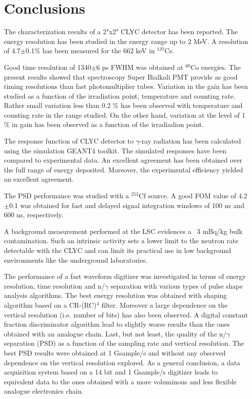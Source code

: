 \documentclass[review,number,sort&compress]{elsarticle}
\begin{document}
\section{Conclusions}
The characterization results of a 2"x2" CLYC detector has been reported. The energy resolution has been studied in the energy range up to 2 MeV. A resolution of 4.7$\pm$0.1$\%$ has been measured for the 662 keV in $^{137}$Cs. 

Good time resolution of 1340$\pm$6 ps FWHM was obtained at $^{60}$Co energies. The present results showed that spectroscopy Super Bialkali PMT provide as good timing resolutions than fast photomultiplier tubes. Variation in the gain has been studied as a function of the irradiation point, temperature and counting rate. Rather small variation less than 0.2 $\%$ has been observed with temperature and counting rate in the range studied. On the other hand, variation at the level of 1$\%$ in gain has been observed as a function of the irradiadion point.

The response function of CLYC detector to $\gamma$-ray radiation has been calculated using the simulation GEANT4 toolkit. The simulated responses have been compared to experimental data. An excellent agreement has been obtained over the full range of energy deposited. Moreover, the experimental efficiency yielded an excellent agreement.

The PSD performance was studied with a $^{252}$Cf source. A good FOM value of 4.2$\pm$0.1 was obtained for fast and delayed signal integration windows of 100 ns and 600 ns, respectively.

A background measurement performed at the LSC evidences a ~3 mBq/kg bulk contamination. Such an intrinsic activity sets a lower limit to the neutron rate detectable with the CLYC and can limit its practical use in low background environments like the underground laboratories.

The performance of a fast waveform digitizer was investigated in terms of energy resolution, time resolution and n/$\gamma$ separation with various types of pulse shape analysis algorithms. The best energy resolution was obtained with shaping algorithm based on a CR-(RC)$^4$ filter. Moreover a large dependence on the vertical resolution (i.e. number of bits) has also been observed. A digital constant fraction discriminator algorithm lead to slightly worse results than the ones obtained with an analogue chain. Last, but not least, the quality of the n/$\gamma$ separation (PSD) as a function of the sampling rate and vertical resolution. The best PSD results were obtained at 1 Gsample/s and without any observed dependence on the vertical resolution explored. As a general conclusion, a data acquisition system based on a 14 bit and 1 Gsample/s digitizer leads to equivalent data to the ones obtained with a more voluminous and less flexible analogue electronics chain.
\end{document}
